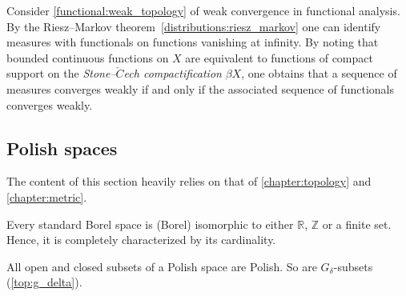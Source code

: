     \begin{remark}
        Consider \cref{functional:weak_topology} of weak convergence in functional analysis. By the Riesz--Markov theorem~\ref{distributions:riesz_markov} one can identify measures with functionals on functions vanishing at infinity. By noting that bounded continuous functions on $X$ are equivalent to functions of compact support on the \textit{Stone--$\check{C}$ech compactification} $\beta X$, one obtains that a sequence of measures converges weakly if and only if the associated sequence of functionals converges weakly.

    \end{remark}

\subsection{Polish spaces}

    The content of this section heavily relies on that of \cref{chapter:topology} and \cref{chapter:metric}.


    \begin{theorem}[Kuratowski]
        Every standard Borel space is (Borel) isomorphic to either $\mathbb{R}$, $\mathbb{Z}$ or a finite set. Hence, it is completely characterized by its cardinality.
    \end{theorem}

    \begin{property}
        All open and closed subsets of a Polish space are Polish. So are $G_\delta$-subsets (\cref{top:g_delta}).
    \end{property}


